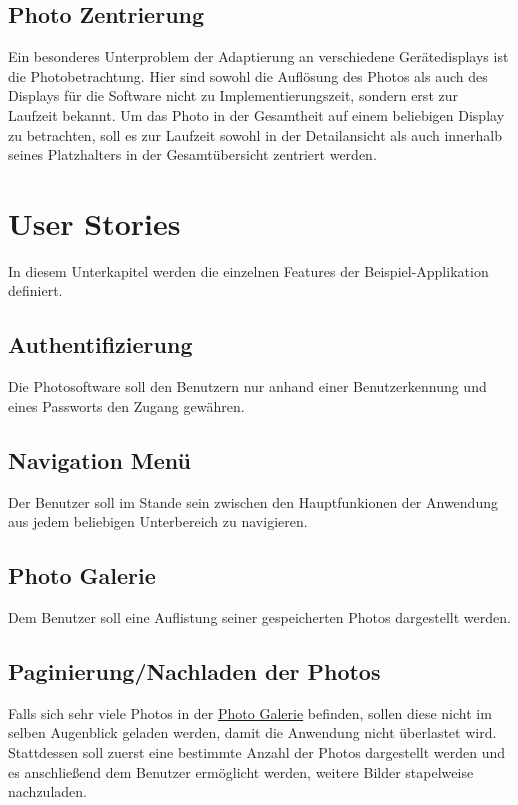 \subsection{Photo Zentrierung}
\label{sec:spec:photo_centering}

Ein besonderes Unterproblem der Adaptierung an verschiedene Gerätedisplays ist die Photobetrachtung. Hier sind sowohl die Auflösung des Photos als auch des Displays für die Software nicht zu Implementierungszeit, sondern erst zur Laufzeit bekannt. Um das Photo in der Gesamtheit auf einem beliebigen Display zu betrachten, soll es zur Laufzeit sowohl in der Detailansicht als auch innerhalb seines Platzhalters in der Gesamtübersicht zentriert werden.

\section{User Stories}

In diesem Unterkapitel werden die einzelnen Features der Beispiel-Applikation definiert.

\subsection{Authentifizierung}
\label{sec:spec:authentication}

Die Photosoftware soll den Benutzern nur anhand einer Benutzerkennung und eines Passworts den Zugang gewähren.

\subsection{Navigation Menü}
\label{sec:spec:menu}

Der Benutzer soll im Stande sein zwischen den Hauptfunkionen der Anwendung aus jedem beliebigen Unterbereich zu navigieren.

\subsection{Photo Galerie}
\label{sec:spec:photo_gallery}

Dem Benutzer soll eine Auflistung seiner gespeicherten Photos dargestellt werden.

\subsection{Paginierung/Nachladen der Photos}

Falls sich sehr viele Photos in der \hyperref[sec:spec:photo_gallery]{Photo Galerie} befinden, sollen diese nicht im selben Augenblick geladen werden, damit die Anwendung nicht überlastet wird. Stattdessen soll zuerst eine bestimmte Anzahl der Photos dargestellt werden und es anschließend dem Benutzer ermöglicht werden, weitere Bilder stapelweise nachzuladen.

